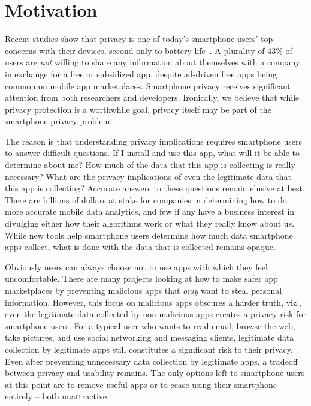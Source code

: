 
\section{Motivation}
\label{sec-motivation}

Recent studies show that privacy is one of today's smartphone users' top
concerns with their devices, second only to battery
life~\cite{truste-privacy}. A plurality of 43\% of users are \textit{not}
willing to share any information about themselves with a company in exchange
for a free or subsidized app, despite ad-driven free apps being common on
mobile app marketplaces. Smartphone privacy receives significant attention
from both researchers and developers.  Ironically, we believe that while
privacy protection is a worthwhile goal, privacy itself may be part of the
smartphone privacy problem.

The reason is that understanding privacy implications requires smartphone
users to answer difficult questions. If I install and use this app, what will it
be able to determine about me? How much of the data that this app is
collecting is really necessary? What are the privacy implications of even the
legitimate data that this app is collecting? Accurate answers to these
questions remain elusive at best. There are billions of dollars at stake for
companies in determining how to do more accurate mobile data analytics, and
few if any have a business interest in divulging either how their algorithms
work or what they really know about us. While new tools help smartphone users
determine how much data smartphone apps collect, what is done with the data
that is collected remains opaque.

Obviously users can always choose not to use apps with which they feel
uncomfortable.  There are many projects looking at how to make safer
app marketplaces by preventing malicious apps that \textit{only} want to
steal personal information.  However, this focus on malicious apps obscures a
harder truth, viz., even the legitimate data collected by non-malicious apps
creates a privacy risk for smartphone users. For a typical user who wants to
read email, browse the web, take pictures, and use social networking
and messaging clients, legitimate data collection by legitimate apps still
constitutes a significant risk to their privacy. Even after preventing
unnecessary data collection by legitimate apps, a tradeoff between privacy
and usability remains. The only options left to smartphone users at this point
are to remove useful apps or to cease using their smartphone entirely -- both
unattractive.

